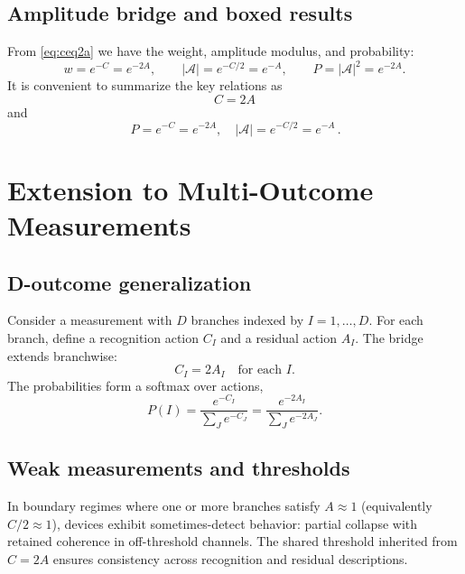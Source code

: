 \documentclass[reprint,aps,prd,nofootinbib]{revtex4-2}
\begin{document}
\subsection{Amplitude bridge and boxed results}
From \eqref{eq:ceq2a} we have the weight, amplitude modulus, and probability:
\begin{equation}
  w=e^{-C}=e^{-2A},\qquad |\mathcal{A}|=e^{-C/2}=e^{-A},\qquad P=|\mathcal{A}|^2=e^{-2A}.\label{eq:amplitude}
\end{equation}
It is convenient to summarize the key relations as
\begin{equation}
  \boxed{\,C=2A\,}
\end{equation}
and
\begin{equation}
  \boxed{\,P = e^{-C} = e^{-2A},\quad |\mathcal{A}| = e^{-C/2} = e^{-A}\,}.
\end{equation}

\section{Extension to Multi-Outcome Measurements}
\label{sec:multi}

\subsection{D-outcome generalization}
Consider a measurement with $D$ branches indexed by $I=1,\dots,D$. For each branch, define a recognition action $C_I$ and a residual action $A_I$. The bridge extends branchwise:
\begin{equation}
  C_I = 2A_I\quad \text{for each } I.\label{eq:branchwise}
\end{equation}
The probabilities form a softmax over actions,
\begin{equation}
  P(I) = \frac{e^{-C_I}}{\sum_J e^{-C_J}} = \frac{e^{-2A_I}}{\sum_J e^{-2A_J}}.\label{eq:softmax}
\end{equation}

\subsection{Weak measurements and thresholds}
In boundary regimes where one or more branches satisfy $A\approx 1$ (equivalently $C/2\approx 1$), devices exhibit sometimes-detect behavior: partial collapse with retained coherence in off-threshold channels. The shared threshold inherited from $C=2A$ ensures consistency across recognition and residual descriptions.
\end{document}
